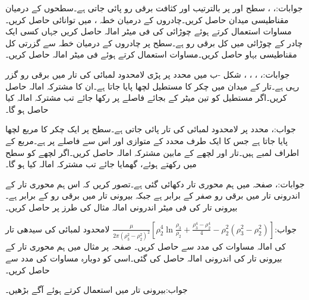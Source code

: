 جوابات:، ، 
سطح  اور  پر بالترتیب  اور  کثافت برقی رو پائی جاتی ہے۔سطحوں کے درمیان مقناطیسی میدان  حاصل کریں۔چادروں کے درمیان خطہ ،  میں توانائی  حاصل کریں۔ مساوات  استعمال کرتے ہوئے  چوڑائی کی فی میٹر امالہ حاصل کریں جہاں  کسی ایک چادر کے  چوڑائی میں کل برقی رو ہے۔سطح  پر چادروں کے درمیان خطہ  سے گزرتی کل مقناطیسی بہاو  حاصل کریں۔مساوات  استعمال کرتے ہوئے فی میٹر امالہ حاصل کریں۔

جوابات:، ، ، ، 
شکل -ب میں  محدد پر پڑی لامحدود لمبائی کی تار میں برقی رو  گزر رہی ہے۔تار کے میدان میں  چکر کا مستطیل لچھا پایا جاتا ہے۔ان کا مشترکہ امالہ حاصل کریں۔اگر مستطیل کو تین میٹر کے بجائے  فاصلے پر رکھا جائے تب مشترکہ امالہ کیا حاصل ہو گا۔

جواب:، 
محدد  پر لامحدود لمبائی کی تار پائی جاتی ہے۔سطح  پر ایک چکر کا مربع لچھا پایا جاتا ہے جس کا ایک طرف  محدد کے متوازی اور اس سے  فاصلے پر ہے۔مربع کے اطراف  لمبے ہیں۔تار اور لچھے کے مابین مشترکہ امالہ  حاصل کریں۔اگر لچھے کو  سطح میں رکھتے ہوئے،  گھمایا جائے تب مشترکہ امالہ کیا ہو گا۔

جوابات:، 
صفحہ  میں ہم محوری تار دکھائی گئی ہے۔تصور کریں کہ اس ہم محوری تار کے اندرونی تار میں برقی رو صفر کے برابر ہے جبکہ بیرونی تار میں برقی رو  کے برابر ہے۔بیرونی تار کی فی میٹر اندرونی امالہ مثال  کی طرز پر حاصل کریں۔ 

جواب:$\frac{\mu}{2\pi \left(\rho_3^2-\rho_2^2 \right)^2} \left[\rho_2^4 \ln \frac{\rho_3}{\rho_2}+\frac{\rho_3^4-\rho_2^4}{4}-\rho_2^2 \left(\rho_3^2-\rho_2^2\right) \right]$
لامحدود لمبائی کی سیدھی تار کی امالہ مساوات  کی مدد سے حاصل کریں۔
صفحہ  پر مثال  میں ہم محوری تار کے بیرونی تار کی اندرونی امالہ حاصل کی گئی۔اسی کو دوبارہ مساوات  کی مدد سے حاصل کریں۔

جواب:بیرونی تار میں  استعمال کرتے ہوئے آگے بڑھیں۔
